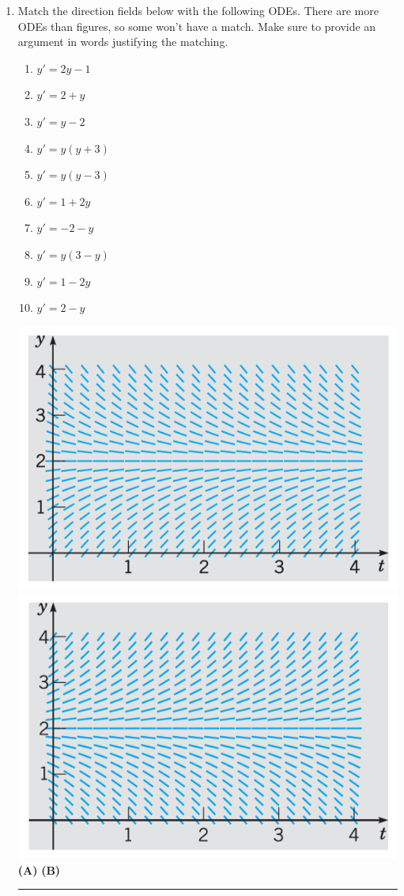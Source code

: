 \begin{enumerate}
\clearpage
\item Match the direction fields below with the following ODEs. There are more ODEs than figures, so some won't have a match. Make sure to provide an argument in words justifying the matching.
\begin{multicols}{2}
    \begin{enumerate}[label={(\roman{enumii})},nosep,itemsep=1mm]
        \item $y'=2y-1$
        \item $y'=2+y$
        \item $y'=y-2$
        \item $y'=y(y+3)$
        \item $y'=y(y-3)$
        \item $y'=1+2y$
        \item $y'=-2-y$
        \item $y'=y(3-y)$
        \item $y'=1-2y$
        \item $y'=2-y$
    \end{enumerate}
    \end{multicols}

\includegraphics[width=0.5\linewidth]{field1}
\includegraphics[width=0.5\linewidth]{field2}\\
\null\hfill\textbf{(A)}\hfill\hfill
\textbf{(B)}\hfill
\null

\vspace{3mm}
\hrule


\end{enumerate}
